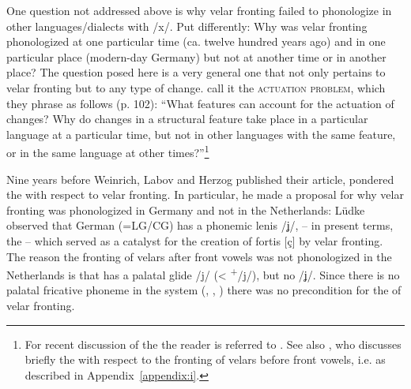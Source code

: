 One question not addressed above is why velar fronting failed to phonologize in other languages/dialects with /x/. Put differently: Why was velar fronting phonologized at one particular time (ca. twelve hundred years ago) and in one particular place (modern-day Germany) but not at another time or in another place? The question posed here is a very general one that not only pertains to velar fronting but to any type of change. \citet{WeinreichHerzog1968} call it the \textsc{actuation} \textsc{problem}, which they phrase as follows (p. 102): “What features can account for the actuation of changes? Why do changes in a structural feature take place in a particular language at a particular time, but not in other languages with the same feature, or in the same language at other times?”\footnote{For recent discussion of the  the reader is referred to \citet{Walkden2017}. See also \citet[401]{Janda2005}, who discusses briefly the  with respect to the fronting of velars before front vowels, i.e.  as described in Appendix~\ref{appendix:i}.}

Nine years before Weinrich, Labov and Herzog published their article, \citet{Lüdtke1959} pondered the  with respect to velar fronting. In particular, he made a proposal for why velar fronting was phonologized in Germany and not in the Netherlands: Lüdke observed that German (=LG/CG) has a phonemic lenis /ʝ/, -- in present terms, the  -- which served as a catalyst for the creation of fortis [ç] by velar fronting. The reason the fronting of velars after front vowels was not phonologized in the Netherlands is that  has a palatal glide /j/ (<  \textsuperscript{+}/j/), but no /ʝ/. Since there is no palatal fricative phoneme in the  system (\citealt{Gussenhoven1992}, \citealt{Booij1995}, \citealt{Verhoeven2005}) there was no precondition for the  of velar fronting.

